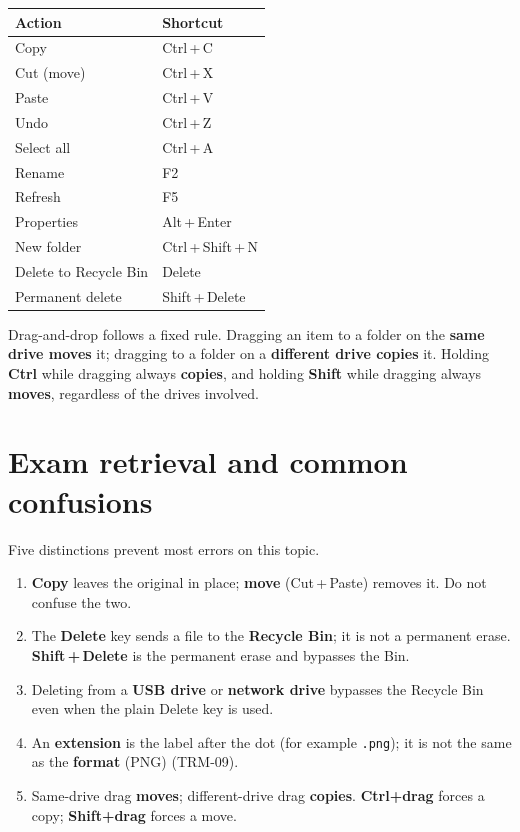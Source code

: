 \documentclass[11pt]{article}
\begin{document}
\begin{center}
\begin{tabular}{p{}p{}}
\toprule
\textbf{Action} & \textbf{Shortcut} \\
\midrule
Copy & Ctrl\,+\,C \\
Cut (move) & Ctrl\,+\,X \\
Paste & Ctrl\,+\,V \\
Undo & Ctrl\,+\,Z \\
Select all & Ctrl\,+\,A \\
Rename & F2 \\
Refresh & F5 \\
Properties & Alt\,+\,Enter \\
New folder & Ctrl\,+\,Shift\,+\,N \\
Delete to Recycle Bin & Delete \\
Permanent delete & Shift\,+\,Delete \\
\bottomrule
\end{tabular}
\end{center}

Drag-and-drop follows a fixed rule. Dragging an item to a folder on the
\textbf{same drive moves} it; dragging to a folder on a \textbf{different
drive copies} it. Holding \textbf{Ctrl} while dragging always \textbf{copies},
and holding \textbf{Shift} while dragging always \textbf{moves}, regardless
of the drives involved.

\section{Exam retrieval and common confusions}
Five distinctions prevent most errors on this topic.
\begin{enumerate}
  \item \textbf{Copy} leaves the original in place; \textbf{move}
    (Cut\,+\,Paste) removes it. Do not confuse the two.
  \item The \textbf{Delete} key sends a file to the \textbf{Recycle Bin}; it
    is not a permanent erase. \textbf{Shift\,+\,Delete} is the permanent
    erase and bypasses the Bin.
  \item Deleting from a \textbf{USB drive} or \textbf{network drive} bypasses
    the Recycle Bin even when the plain Delete key is used.
  \item An \textbf{extension} is the label after the dot (for example
    \texttt{.png}); it is not the same as the \textbf{format} (PNG)
    (TRM-09).
  \item Same-drive drag \textbf{moves}; different-drive drag \textbf{copies}.
    \textbf{Ctrl+drag} forces a copy; \textbf{Shift+drag} forces a move.
\end{enumerate}
\end{document}
